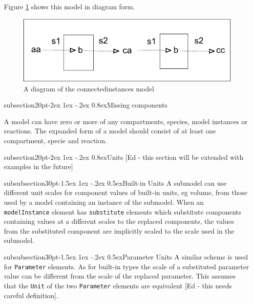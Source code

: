 \documentclass[10pt]{article}
\makeatletter
\renewcommand{\subsection}{\@startsection%
  {subsection}{2}{0pt}{-2ex \@plus 1ex \@minus -.2ex}%
  {0.8ex}{\slshape\large\bfseries\sffamily}}
\renewcommand{\subsubsection}{\@startsection%
  {subsubsection}{3}{0pt}{-1.5ex \@plus 1ex \@minus -.2ex}%
  {0.5ex}{\slshape\normalsize\bfseries\sffamily}}
\newcommand{\class}[1]{\texttt{#1}}
\makeatother
\begin{document}
Figure \ref{fig:connectedinstances} shows this model in diagram form.

\begin{figure}

  \centering

  \includegraphics[scale = 0.75]{connectedinstances}

  \caption{A diagram of the connectedinstances model}

  \label{fig:connectedinstances}

\end{figure}

\subsection{Missing components}

A model can have zero or more of any compartments, species,
model instances or reactions. The expanded form of a model should
consist of at least one compartment, specie and reaction.

\subsection{Units}
[Ed - this section will be extended with examples in the future]

\subsubsection{Built-in Units}
A submodel can use different unit scales for component values of
built-in units, eg volume, from those used by a model containing
an instance of the submodel. When an \class{modelInstance} element has
\class{substitute} elements which substitute components containing
values at a different scales to the replaced components, the
values from the substituted component are implicitly scaled to
the scale used in the submodel.

\subsubsection{Parameter Units}
A similar scheme is used for \class{Parameter} elements.  As for
built-in types the scale of a substituted parameter value can be
different from the scale of the replaced parameter.  This assumes
that the \class{Unit} of the two \class{Parameter} elements are
equivalent [Ed - this needs careful definition].
\end{document}
